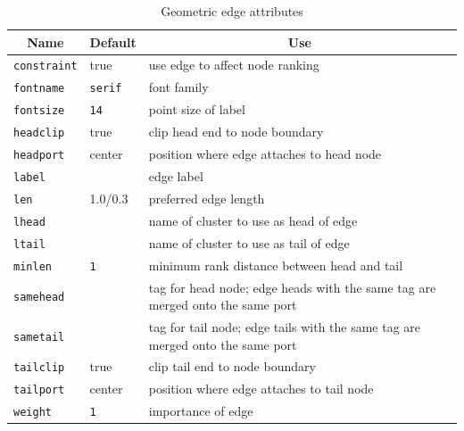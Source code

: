 \begin{table}[htbp]\footnotesize
\centering
\begin{tabular}[t]{|l|l|p{2.5in}|} \hline
\multicolumn{1}{|c|}{Name} & \multicolumn{1}{c|}{Default} & \multicolumn{1}{c|}{Use} \\ \hline
{\tt constraint} & true & use edge to affect node ranking \\
{\tt fontname} & {\tt serif} & font family \\
{\tt fontsize} & {\tt 14} & point size of label \\
{\tt headclip} & true & clip head end to node boundary \\
{\tt headport} & center & position where edge attaches to head node \\
{\tt label} & & edge label \\
{\tt len} & 1.0/0.3 & preferred edge length \\
{\tt lhead} & & name of cluster to use as head of edge \\
{\tt ltail} & & name of cluster to use as tail of edge \\
{\tt minlen} & {\tt 1} & minimum rank distance between head and tail \\
{\tt samehead} & & tag for head node; edge heads with the same tag are merged
 onto the same port \\
{\tt sametail} & & tag for tail node; edge tails with the same tag are merged
 onto the same port \\
{\tt tailclip} & true & clip tail end to node boundary \\
{\tt tailport} & center & position where edge attaches to tail node \\
{\tt weight} & {\tt 1} & importance of edge \\
\hline
\end{tabular}
\caption{Geometric edge attributes}
\label{tab:eattr_geom}
\end{table}
